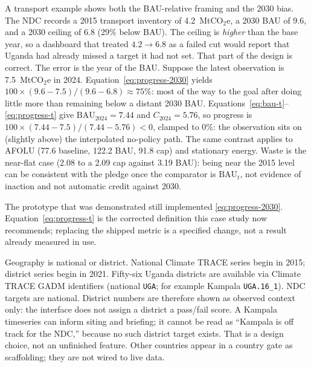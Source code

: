 \documentclass{article}
\begin{document}
A transport example shows both the BAU-relative framing and the 2030 bias. The NDC records a 2015 transport inventory of 4.2~MtCO$_2$e, a 2030 BAU of 9.6, and a 2030 ceiling of 6.8 (29\% below BAU). The ceiling is \emph{higher} than the base year, so a dashboard that treated $4.2\to 6.8$ as a failed cut would report that Uganda had already missed a target it had not set. That part of the design is correct. The error is the year of the BAU. Suppose the latest observation is 7.5~MtCO$_2$e in 2024. Equation~\eqref{eq:progress-2030} yields $100\times(9.6-7.5)/(9.6-6.8)\approx 75\%$: most of the way to the goal after doing little more than remaining below a distant 2030 BAU. Equations~\eqref{eq:bau-t}--\eqref{eq:progress-t} give $\mathrm{BAU}_{2024}=7.44$ and $C_{2024}=5.76$, so progress is $100\times(7.44-7.5)/(7.44-5.76)<0$, clamped to $0\%$: the observation sits on (slightly above) the interpolated no-policy path. The same contrast applies to AFOLU (77.6 baseline, 122.2 BAU, 91.8 cap) and stationary energy. Waste is the near-flat case (2.08 to a 2.09 cap against 3.19 BAU): being near the 2015 level can be consistent with the pledge once the comparator is $\mathrm{BAU}_{t}$, not evidence of inaction and not automatic credit against 2030.

The prototype that was demonstrated still implemented \eqref{eq:progress-2030}. Equation~\eqref{eq:progress-t} is the corrected definition this case study now recommends; replacing the shipped metric is a specified change, not a result already measured in use.

Geography is national or district. National Climate TRACE series begin in 2015; district series begin in 2021. Fifty-six Uganda districts are available via Climate TRACE GADM identifiers (national \texttt{UGA}; for example Kampala \texttt{UGA.16\_1}). NDC targets are national. District numbers are therefore shown as observed context only: the interface does not assign a district a pass/fail score. A Kampala timeseries can inform siting and briefing; it cannot be read as ``Kampala is off track for the NDC,'' because no such district target exists. That is a design choice, not an unfinished feature. Other countries appear in a country gate as scaffolding; they are not wired to live data.
\end{document}

